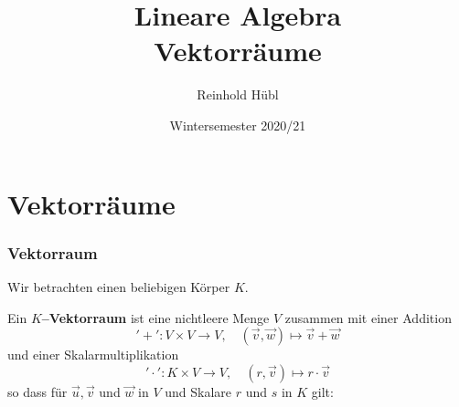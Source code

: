 \documentclass[hyperref={pdfpagelabels=false}]{beamer}
\title{Lineare Algebra \\ Vektorräume}
\author{ Reinhold Hübl}
\date{Wintersemester 2020/21}
\theoremstyle{plain}%
\theoremstyle{definition}
\theoremstyle{remark}
\newcommand{\vektor}[1]{\overrightarrow{#1}}
\begin{document}
\begin{frame}
\titlepage
\centering 
 
\end{frame} 



\section{Vektorräume}


\begin{frame}
\frametitle{Vektorraum}

Wir betrachten einen beliebigen Körper $K$.

\pause 

\begin{definition} Ein \textbf{$K$--Vektorraum} ist eine 
nichtleere Menge $V$ zusammen mit einer Addition 
  	$$ '+': V \times V \longrightarrow V, \quad (\vektor{v}, \vektor{w}) 
     	\longmapsto \vektor{v} + \vektor{w} $$
und einer Skalarmultiplikation 
  	$$ '\cdot': K \times V \longrightarrow V, \quad (r, \vektor{v}) 
     	\longmapsto r \cdot \vektor{v} $$
so dass für $\vektor{u}, \vektor{v}$ und 
$\vektor{w}$ in $V$ und Skalare $r$ und $s$ in $K$ gilt:

\end{definition}
\end{frame}
\end{document}
